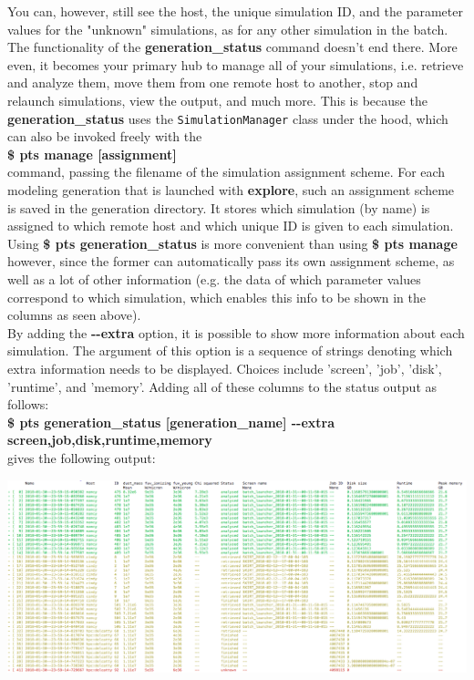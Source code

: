 \documentclass[15pt,a4paper,oneside,openright]{report}
\begin{document}
You can, however, still see the host, the unique simulation ID, and the parameter values for the "unknown" simulations, as for any other simulation in the batch.\\

The functionality of the \textbf{generation\_status} command doesn't end there. More even, it becomes your primary hub to manage all of your simulations, i.e. retrieve and analyze them, move them from one remote host to another, stop and relaunch simulations, view the output, and much more. This is because the \textbf{generation\_status} uses the \texttt{SimulationManager} class under the hood, which can also be invoked freely with the \\

\textbf{\$ pts manage [assignment]}\\

command, passing the filename of the simulation assignment scheme. For each modeling generation that is launched with \textbf{explore}, such an assignment scheme is saved in the generation directory. It stores which simulation (by name) is assigned to which remote host and which unique ID is given to each simulation. Using \textbf{\$ pts generation\_status} is more convenient than using \textbf{\$ pts manage} however, since the former can automatically pass its own assignment scheme, as well as a lot of other information (e.g. the data of which parameter values correspond to which simulation, which enables this info to be shown in the columns as seen above).\\

By adding the \textbf{-{}-extra} option, it is possible to show more information about each simulation. The argument of this option is a sequence of strings denoting which extra information needs to be displayed. Choices include 'screen', 'job', 'disk', 'runtime', and 'memory'. Adding all of these columns to the status output as follows:\\

\textbf{\$ pts generation\_status [generation\_name] -{}-extra screen,job,disk,runtime,memory}\\

gives the following output:

\begin{center}
\includegraphics[width=\textwidth]{figures/status_extra.png}
\end{center}
\end{document}
